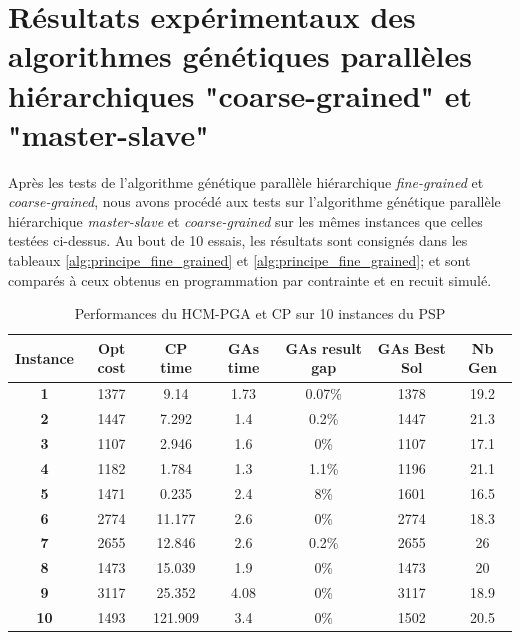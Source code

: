 \documentclass[12pt,a4paper]{article}
\begin{document}
		\section{Résultats expérimentaux des algorithmes génétiques parallèles hiérarchiques "coarse-grained" et "master-slave"}
		
		Après les tests de l'algorithme génétique parallèle hiérarchique \emph{fine-grained} et \emph{coarse-grained}, nous avons procédé aux tests sur l'algorithme génétique parallèle hiérarchique \emph{master-slave} et \emph{coarse-grained} sur les mêmes instances que celles testées ci-dessus. Au bout de 10 essais, les résultats sont consignés dans les tableaux \ref{alg:principe_fine_grained}  et \ref{alg:principe_fine_grained}; et sont comparés à ceux obtenus en programmation par contrainte et en recuit simulé.
		
		\begin{table}[h]
		\centering
		\begin{tabular}{|c|c|c|c|c|c|c|}
			\hline
			\textbf{Instance} & \textbf{Opt cost} & \textbf{CP time} & \textbf{GAs time} & \textbf{GAs result gap} & \textbf{GAs Best Sol} & \textbf{Nb Gen}\\
			\hline
			\textbf{1} & 1377 & 9.14 & 1.73 & 0.07\% & 1378 & 19.2 \\
			\textbf{2} & 1447 & 7.292 & 1.4 & 0.2\% & 1447 & 21.3\\
			\textbf{3} & 1107 & 2.946 & 1.6 & 0\% & 1107 & 17.1\\
			\textbf{4} & 1182 & 1.784 & 1.3 & 1.1\% & 1196 & 21.1\\
			\textbf{5} & 1471 & 0.235 & 2.4 & 8\% & 1601 & 16.5\\
			\textbf{6} & 2774 & 11.177 & 2.6 & 0\% & 2774 & 18.3\\
			\textbf{7} & 2655 & 12.846 & 2.6 & 0.2\% & 2655 & 26\\
			\textbf{8} & 1473 & 15.039 & 1.9 & 0\% & 1473 & 20\\
			\textbf{9} & 3117 & 25.352 & 4.08 & 0\% & 3117 & 18.9\\
			\textbf{10} & 1493 & 121.909 & 3.4 & 0\% & 1502 & 20.5\\
			\hline
		\end{tabular}	
		\caption{Performances du HCM-PGA et CP sur 10 instances du PSP}	
		\label{tab:hcm_pga_cp}	
	\end{table}	
	
\end{document}
